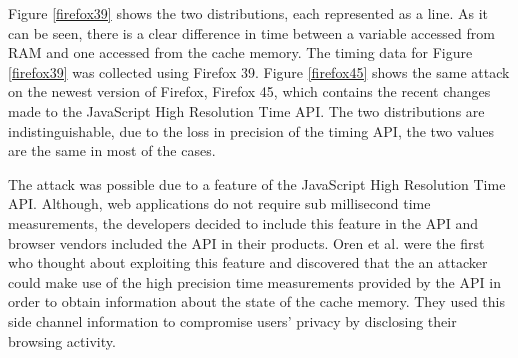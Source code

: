 \documentclass[10pt,a4paper,twoside]{book}
\begin{document}
Figure \ref{firefox39} shows the two distributions, each represented as a line. As it can be seen, there is a clear difference in time between a variable accessed from RAM and one accessed from the cache memory. The timing data for Figure \ref{firefox39} was collected using Firefox 39. Figure \ref{firefox45} shows the same attack on the newest version of Firefox, Firefox 45, which contains the recent changes made to the JavaScript High Resolution Time API. The two distributions are indistinguishable, due to the loss in precision of the timing API, the two values are the same in most of the cases.

 
%

The attack was possible due to a feature of the JavaScript High Resolution Time API. Although, web applications do not require sub millisecond time measurements, the developers decided to include this feature in the API and browser vendors included the API in their products. Oren et al. were the first who thought about exploiting this feature and discovered that the an attacker could make use of the high precision time measurements provided by the API in order to obtain information about the state of the cache memory. They used this side channel information to compromise users' privacy by disclosing their browsing activity.
 
\end{document}
